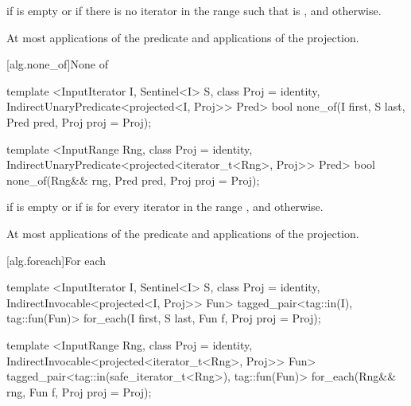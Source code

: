 \begin{itemdescr}
\pnum
\returns {} if  is empty or
if there is no iterator  in the range
 such that
is , and  otherwise.

\pnum
\complexity At most  applications of the predicate
and  applications of the projection.
\end{itemdescr}

[alg.none_of]{None of}

%
\begin{itemdecl}
template <InputIterator I, Sentinel<I> S, class Proj = identity,
    IndirectUnaryPredicate<projected<I, Proj>> Pred>
  bool none_of(I first, S last, Pred pred, Proj proj = Proj{});

template <InputRange Rng, class Proj = identity,
    IndirectUnaryPredicate<projected<iterator_t<Rng>, Proj>> Pred>
  bool none_of(Rng&& rng, Pred pred, Proj proj = Proj{});
\end{itemdecl}

\begin{itemdescr}
\pnum
\returns {} if
 is empty or if
is  for every iterator  in the range ,
and  otherwise.

\pnum
\complexity At most  applications of the predicate
and  applications of the projection.
\end{itemdescr}

[alg.foreach]{For each}

%
\begin{itemdecl}
template <InputIterator I, Sentinel<I> S, class Proj = identity,
    IndirectInvocable<projected<I, Proj>> Fun>
  tagged_pair<tag::in(I), tag::fun(Fun)>
    for_each(I first, S last, Fun f, Proj proj = Proj{});

template <InputRange Rng, class Proj = identity,
    IndirectInvocable<projected<iterator_t<Rng>, Proj>> Fun>
  tagged_pair<tag::in(safe_iterator_t<Rng>), tag::fun(Fun)>
    for_each(Rng&& rng, Fun f, Proj proj = Proj{});
\end{itemdecl}


